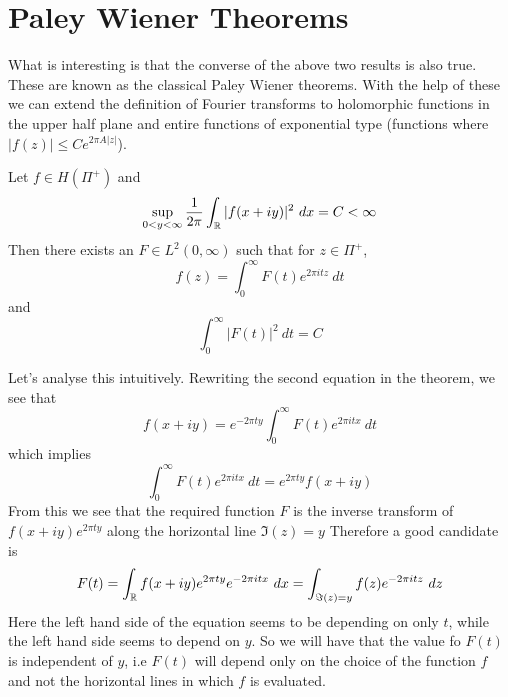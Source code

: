 \section{Paley Wiener Theorems}
What is interesting is that the converse of the above two results is also true. These are known as the classical Paley Wiener theorems. With the help of these we can extend the definition of Fourier transforms to holomorphic functions in the upper half plane and entire functions of exponential type (functions where $|f(z)| \le Ce^{2\pi A |z|}$).

\begin{theorem}
  \label{thm:paley_wiener_in_upper_half_plane}
  Let $f \in H(\Pi^+)$ and $$\sup_{0<y<\infty} \frac{1}{2\pi} \int_\mathbb R |f(x+iy)|^2 \ dx = C < \infty$$
  Then there exists an $F \in L^2(0, \infty)$ such that for $z \in \Pi^+$, $$f(z) = \int_0^\infty F(t)e^{2\pi itz} \ dt$$
  and 
  $$\int_0^\infty |F(t)|^2 \ dt = C $$
\end{theorem}
\begin{note}
  Let's analyse this intuitively. Rewriting the second equation in the theorem, we see that $$f(x+iy) = e^{-2\pi ty}\int_0^\infty F(t) e^{2\pi itx} \ dt $$
  which implies
  $$\int_0^\infty F(t) e^{2\pi itx} \ dt = e^{2\pi t y}f(x+iy)$$
  From this we see that the required function $F$ is the inverse transform of $f(x+iy)e^{2\pi ty}$ along the horizontal line $\Im(z) = y$
  Therefore a good candidate is $$F(t) = \int_\mathbb R f(x+iy)e^{2\pi ty}e^{-2\pi itx} \ dx = \int_{\Im(z) = y} f(z)e^{-2\pi itz} \ dz$$
  Here the left hand side of the equation seems to be depending on only $t$, while the left hand side seems to depend on $y$. So we will have that the value fo $F(t)$ is independent of $y$, i.e $F(t)$ will depend only on the choice of the function $f$ and not the horizontal lines in which $f$ is evaluated.
  \end{note}
